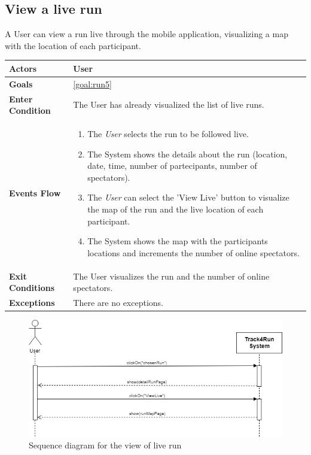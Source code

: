   \subsection{View a live run}
A User can view a run live through the mobile application, visualizing a map with the location of each participant.

\begin{table}[H]
	\centering
    
    \begin{tabular}{|p{3.5cm}|p{10.3cm}|}
    
    \hline
    \textbf{\large{Actors}} & User \\		 			
    \hline
    \textbf{\large{Goals}} 				& \ref{goal:run5}\\
    
    \hline
    \textbf{\large{Enter Condition}}	& The User has already visualized the list of live runs.\\
    
    \hline
    \textbf{\large{Events Flow}}		& \begin{enumerate}[leftmargin=0.5cm]
                                          	\item The \emph{User} selects the run to be followed live.
                                            \item The System shows the details about the run (location, date, time, number of partecipants, number of spectators).
                                             \item The \emph{User} can select the 'View Live' button to visualize the map of the run and the live location of each participant.
                                            \item The System shows the map with the participants locations and increments the number of online spectators.
                                           
                                          \end{enumerate}
    										\\
    \hline
    \textbf{\large{Exit Conditions}}    & The User visualizes the run and the number of online spectators.  \\
    
    \hline
    \textbf{\large{Exceptions}} 		& There are no exceptions. \\
    
    \hline
    
    
    \end{tabular}
	
\end{table}

\begin{figure}[H]
    \centering
    \includegraphics[scale=0.4]{Pictures/viewLiveRun.png}
    \caption{Sequence diagram for the view of live run}
\end{figure}
